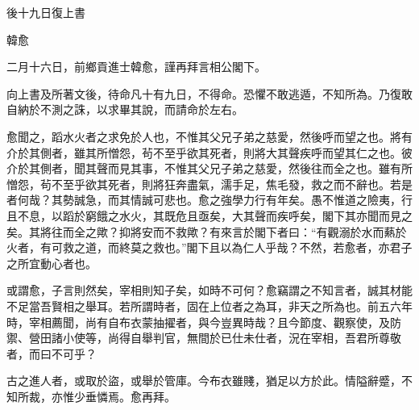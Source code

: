 後十九日復上書

韓愈

二月十六日，前鄉貢進士韓愈，謹再拜言相公閣下。

向上書及所著文後，待命凡十有九日，不得命。恐懼不敢逃遁，不知所為。乃復敢自納於不測之誅，以求畢其說，而請命於左右。

愈聞之，蹈水火者之求免於人也，不惟其父兄子弟之慈愛，然後呼而望之也。將有介於其側者，雖其所憎怨，茍不至乎欲其死者，則將大其聲疾呼而望其仁之也。彼介於其側者，聞其聲而見其事，不惟其父兄子弟之慈愛，然後往而全之也。雖有所憎怨，茍不至乎欲其死者，則將狂奔盡氣，濡手足，焦毛發，救之而不辭也。若是者何哉？其勢誠急，而其情誠可悲也。愈之強學力行有年矣。愚不惟道之險夷，行且不息，以蹈於窮餓之水火，其既危且亟矣，大其聲而疾呼矣，閣下其亦聞而見之矣。其將往而全之歟？抑將安而不救歟？有來言於閣下者曰：“有觀溺於水而爇於火者，有可救之道，而終莫之救也。”閣下且以為仁人乎哉？不然，若愈者，亦君子之所宜動心者也。

或謂愈，子言則然矣，宰相則知子矣，如時不可何？愈竊謂之不知言者，誠其材能不足當吾賢相之舉耳。若所謂時者，固在上位者之為耳，非天之所為也。前五六年時，宰相薦聞，尚有自布衣蒙抽擢者，與今豈異時哉？且今節度、觀察使，及防禦、營田諸小使等，尚得自舉判官，無間於已仕未仕者，況在宰相，吾君所尊敬者，而曰不可乎？

古之進人者，或取於盜，或舉於管庫。今布衣雖賤，猶足以方於此。情隘辭蹙，不知所裁，亦惟少垂憐焉。愈再拜。